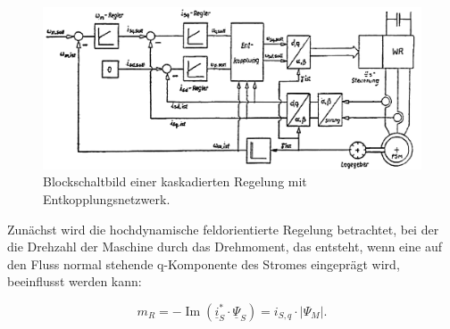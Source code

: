 \begin{figure}[h!]
    \centering
    \includegraphics[scale=0.4]{1/Regelung.png}
    \caption{Blockschaltbild einer kaskadierten Regelung mit Entkopplungsnetzwerk.}
    \label{fig:regelkreis}
\end{figure}

\noindent Zunächst wird die hochdynamische feldorientierte Regelung betrachtet, bei der die Drehzahl der Maschine durch das Drehmoment, das entsteht, wenn eine auf den Fluss normal stehende q-Komponente des Stromes eingeprägt wird, beeinflusst werden kann:

\begin{equation}
    m_R=-\operatorname{Im}(\underline{i}_S^* \cdot \underline{\Psi}_S)= i_{S,q} \cdot |\Psi_M|.
\end{equation}

